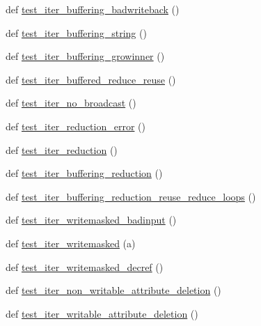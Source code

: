 \begin{DoxyCompactItemize}
\item 
def \hyperlink{namespacenumpy_1_1core_1_1tests_1_1test__nditer_abe31138c0705bcd83b930d9d609e5d98}{test\+\_\+iter\+\_\+buffering\+\_\+badwriteback} ()
\item 
def \hyperlink{namespacenumpy_1_1core_1_1tests_1_1test__nditer_a38d583d70176f53a16515655c57d37d1}{test\+\_\+iter\+\_\+buffering\+\_\+string} ()
\item 
def \hyperlink{namespacenumpy_1_1core_1_1tests_1_1test__nditer_a3fb99f717a62f9b3120cfde8a62c66eb}{test\+\_\+iter\+\_\+buffering\+\_\+growinner} ()
\item 
def \hyperlink{namespacenumpy_1_1core_1_1tests_1_1test__nditer_a23632eb1055dfc8bf83544e72064d74e}{test\+\_\+iter\+\_\+buffered\+\_\+reduce\+\_\+reuse} ()
\item 
def \hyperlink{namespacenumpy_1_1core_1_1tests_1_1test__nditer_aa486265e8973ca461cc1ac45150dfca1}{test\+\_\+iter\+\_\+no\+\_\+broadcast} ()
\item 
def \hyperlink{namespacenumpy_1_1core_1_1tests_1_1test__nditer_a7b0597c4874bff3beb9b41eb5bfb72c2}{test\+\_\+iter\+\_\+reduction\+\_\+error} ()
\item 
def \hyperlink{namespacenumpy_1_1core_1_1tests_1_1test__nditer_a26cf98653e026512870d300fde7c991b}{test\+\_\+iter\+\_\+reduction} ()
\item 
def \hyperlink{namespacenumpy_1_1core_1_1tests_1_1test__nditer_aa5e826656acfdb552595b8a79c4b69b9}{test\+\_\+iter\+\_\+buffering\+\_\+reduction} ()
\item 
def \hyperlink{namespacenumpy_1_1core_1_1tests_1_1test__nditer_ad9582ac56cdd5e3925724d14cde64b6b}{test\+\_\+iter\+\_\+buffering\+\_\+reduction\+\_\+reuse\+\_\+reduce\+\_\+loops} ()
\item 
def \hyperlink{namespacenumpy_1_1core_1_1tests_1_1test__nditer_ac8d05bd03e45400f673ffbb3a6009646}{test\+\_\+iter\+\_\+writemasked\+\_\+badinput} ()
\item 
def \hyperlink{namespacenumpy_1_1core_1_1tests_1_1test__nditer_ae0eeb1096ae1a26922c66997d585d97f}{test\+\_\+iter\+\_\+writemasked} (a)
\item 
def \hyperlink{namespacenumpy_1_1core_1_1tests_1_1test__nditer_ac714677b62fb3308767f90bfbfa305ea}{test\+\_\+iter\+\_\+writemasked\+\_\+decref} ()
\item 
def \hyperlink{namespacenumpy_1_1core_1_1tests_1_1test__nditer_a1ad19185738f82597beb85ed78bad8d4}{test\+\_\+iter\+\_\+non\+\_\+writable\+\_\+attribute\+\_\+deletion} ()
\item 
def \hyperlink{namespacenumpy_1_1core_1_1tests_1_1test__nditer_a10d183bcd79cf46c08867290b3afb58e}{test\+\_\+iter\+\_\+writable\+\_\+attribute\+\_\+deletion} ()

\end{DoxyCompactItemize}
